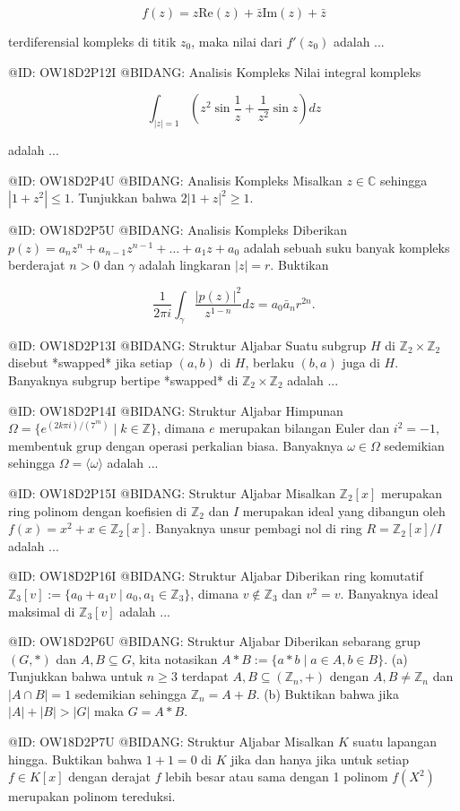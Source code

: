 $$
f(z) = z\text{Re}(z) + \bar{z}\text{Im}(z) + \bar{z}
$$

terdiferensial kompleks di titik $z_0$, maka nilai dari $f'(z_0)$ adalah ...

@ID: OW18D2P12I
@BIDANG: Analisis Kompleks
Nilai integral kompleks 

$$
\int_{|z|=1} \left( z^2 \sin\frac{1}{z} + \frac{1}{z^2} \sin z \right) dz
$$

adalah ...

@ID: OW18D2P4U
@BIDANG: Analisis Kompleks
Misalkan $z \in \mathbb{C}$ sehingga $|1 + z^2| \le 1$. Tunjukkan bahwa $2|1 + z|^2 \ge 1$.

@ID: OW18D2P5U
@BIDANG: Analisis Kompleks
Diberikan $p(z) = a_n z^n + a_{n-1} z^{n-1} + \dots + a_1 z + a_0$ adalah sebuah suku banyak kompleks berderajat $n > 0$ dan $\gamma$ adalah lingkaran $|z| = r$. Buktikan 

$$
\frac{1}{2\pi i} \int_{\gamma} \frac{|p(z)|^2}{z^{1-n}} dz = a_0 \bar{a}_n r^{2n}.
$$

@ID: OW18D2P13I
@BIDANG: Struktur Aljabar
Suatu subgrup $H$ di $\mathbb{Z}_2 \times \mathbb{Z}_2$ disebut *swapped* jika setiap $(a, b)$ di $H$, berlaku $(b, a)$ juga di $H$. Banyaknya subgrup bertipe *swapped* di $\mathbb{Z}_2 \times \mathbb{Z}_2$ adalah ...

@ID: OW18D2P14I
@BIDANG: Struktur Aljabar
Himpunan $\Omega = \{e^{(2k\pi i)/(7^m)} \mid k \in \mathbb{Z}\}$, dimana $e$ merupakan bilangan Euler dan $i^2 = -1$, membentuk grup dengan operasi perkalian biasa. Banyaknya $\omega \in \Omega$ sedemikian sehingga $\Omega = \langle \omega \rangle$ adalah ...

@ID: OW18D2P15I
@BIDANG: Struktur Aljabar
Misalkan $\mathbb{Z}_2[x]$ merupakan ring polinom dengan koefisien di $\mathbb{Z}_2$ dan $I$ merupakan ideal yang dibangun oleh $f(x) = x^2 + x \in \mathbb{Z}_2[x]$. Banyaknya unsur pembagi nol di ring $R = \mathbb{Z}_2[x]/I$ adalah ...

@ID: OW18D2P16I
@BIDANG: Struktur Aljabar
Diberikan ring komutatif $\mathbb{Z}_3[v] := \{a_0 + a_1 v \mid a_0, a_1 \in \mathbb{Z}_3\}$, dimana $v \notin \mathbb{Z}_3$ dan $v^2 = v$. Banyaknya ideal maksimal di $\mathbb{Z}_3[v]$ adalah ...

@ID: OW18D2P6U
@BIDANG: Struktur Aljabar
Diberikan sebarang grup $(G, *)$ dan $A, B \subseteq G$, kita notasikan $A * B := \{a * b \mid a \in A, b \in B\}$.
(a) Tunjukkan bahwa untuk $n \ge 3$ terdapat $A, B \subseteq (\mathbb{Z}_n, +)$ dengan $A, B \ne \mathbb{Z}_n$ dan $|A \cap B| = 1$ sedemikian sehingga $\mathbb{Z}_n = A + B$.
(b) Buktikan bahwa jika $|A| + |B| > |G|$ maka $G = A * B$.

@ID: OW18D2P7U
@BIDANG: Struktur Aljabar
Misalkan $K$ suatu lapangan hingga. Buktikan bahwa $1 + 1 = 0$ di $K$ jika dan hanya jika untuk setiap $f \in K[x]$ dengan derajat $f$ lebih besar atau sama dengan 1 polinom $f(X^2)$ merupakan polinom tereduksi.